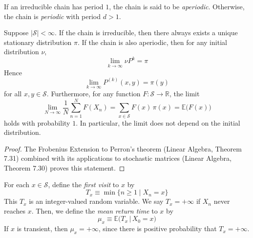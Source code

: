   \begin{definition}
    If an irreducible chain has period $1$, the chain is said to be \textit{aperiodic}. Otherwise, the chain is \textit{periodic} with period $d > 1$. 
  \end{definition}

  \begin{theorem}
    Suppose $|\mathcal{S}| < \infty$. If the chain is irreducible, then there always exists a unique stationary distribution $\pi$. If the chain is also aperiodic, then for any initial distribution $\nu$, 
    \begin{equation}
      \lim_{k \rightarrow \infty} \nu P^k = \pi
    \end{equation}
    Hence
    \begin{equation}
      \lim_{k \rightarrow \infty} P^{(k)}(x, y) = \pi(y)
    \end{equation}
    for all $x, y \in \mathcal{S}$. Furthermore, for any function $F: \mathcal{S} \longrightarrow \mathbb{R}$, the limit
    \begin{equation}
      \lim_{N \rightarrow \infty} \frac{1}{N} \sum_{n=1}^N F(X_n) = \sum_{x \in \mathcal{S}} F(x)\, \pi(x) = \mathbb{E} \big( F(x) \big)
    \end{equation}
    holds with probability $1$. In particular, the limit does not depend on the initial distribution. 
  \end{theorem}
  \begin{proof}
    The Frobenius Extension to Perron's theorem (Linear Algebra, Theorem 7.31) combined with its applications to stochastic matrices (Linear Algebra, Theorem 7.30) proves this statement. 
  \end{proof}

  \begin{definition}
    For each $x \in \mathcal{S}$, define the \textit{first visit} to $x$ by 
    \begin{equation}
      T_x \equiv \min\{ n \geq 1 \; | \; X_n = x\}
    \end{equation}
    This $T_x$ is an integer-valued random variable. We say $T_x = + \infty$ if $X_n$ never reaches $x$. Then, we define the \textit{mean return time} to $x$ by 
    \begin{equation}
      \mu_x \equiv \mathbb{E}\big( T_x \, | \, X_0 = x)
    \end{equation}
    If $x$ is transient, then $\mu_x = + \infty$, since there is positive probability that $T_x = + \infty$. 
  \end{definition}

